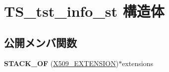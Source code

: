 \hypertarget{struct_t_s__tst__info__st}{}\section{T\+S\+\_\+tst\+\_\+info\+\_\+st 構造体}
\label{struct_t_s__tst__info__st}
\subsection*{公開メンバ関数}
\begin{DoxyCompactItemize}
\item 
\hypertarget{struct_t_s__tst__info__st_a005cc83d9dfc1fb59387d1220dd02de5}{}{\bfseries S\+T\+A\+C\+K\+\_\+\+O\+F} (\hyperlink{struct_x509__extension__st}{X509\+\_\+\+E\+X\+T\+E\+N\+S\+I\+O\+N})$\ast$extensions\label{struct_t_s__tst__info__st_a005cc83d9dfc1fb59387d1220dd02de5}

\end{DoxyCompactItemize}
